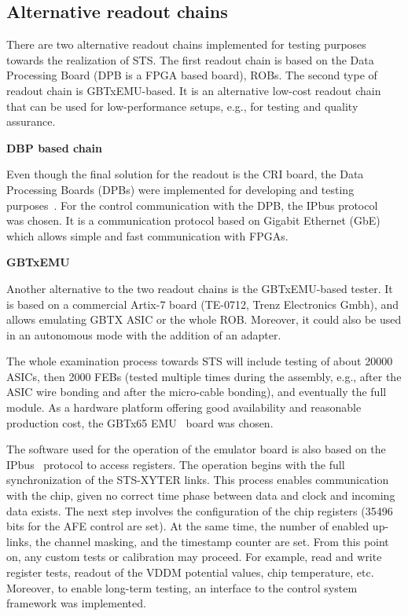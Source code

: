 \subsection{Alternative readout chains}
\label{tester}
There are two alternative readout chains implemented for testing purposes towards the realization of \gls{STS}. The first readout chain is based on the Data Processing Board (\gls{DPB} is a \gls{FPGA} based board), \glspl{ROB}. The second type of readout chain is GBTxEMU-based. It is an alternative low-cost readout chain that can be used for
low-performance setups, e.g., for testing and quality assurance. \bigbreak


\textbf{DBP based chain}\bigbreak


Even though the final solution for the readout is the \gls{CRI} board, the Data Processing Boards (\glspl{DPB}) were implemented for developing and testing purposes~\cite{Loizeau}. For the control communication with the \gls{DPB}, the IPbus protocol~\cite{ipbus} was chosen. It is a communication protocol based on Gigabit Ethernet (GbE) which allows simple and fast communication with \glspl{FPGA}.

\textbf{GBTxEMU} \bigbreak


Another alternative to the two readout chains is the GBTxEMU-based tester. It is based on a commercial Artix-7 board (TE-0712, Trenz Electronics Gmbh), and allows emulating GBTX ASIC or the whole \gls{ROB}. Moreover, it could also be used in an autonomous mode with the addition of an adapter.


The whole examination process towards \gls{STS} will include testing of about 20000 ASICs, then 2000 FEBs (tested  multiple times during the assembly, e.g., after the ASIC wire bonding and after the micro-cable bonding), and eventually the full module. As a hardware platform offering good availability and reasonable production cost, the GBTx65 EMU~\cite{zabolotny1} board was chosen.

The software used for the operation of the emulator board is also based on the IPbus~\cite{ipbus} protocol to access registers.
The operation begins with the full synchronization of the STS-XYTER links. This process enables communication with the chip, given no correct time phase between data and clock and incoming data exists. The next step involves the configuration of the chip registers (35496 bits for the AFE control are set). At the same time, the number of enabled up-links, the channel masking, and the timestamp counter are set.  From this point on, any custom tests or calibration may proceed. For example, read and write register tests, readout of the VDDM potential values, chip temperature, etc. Moreover, to enable long-term testing, an interface to the control system framework was implemented.

